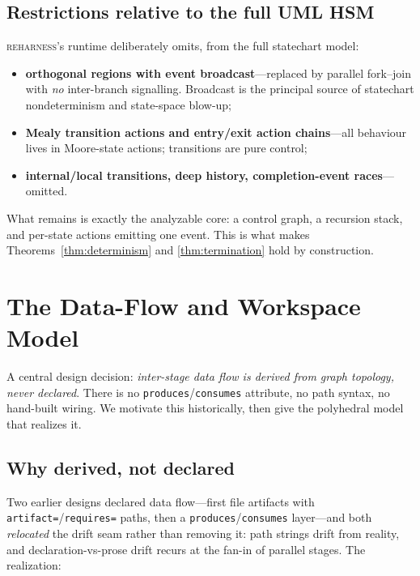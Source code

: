\documentclass[11pt]{article}
\theoremstyle{plain}
\theoremstyle{definition}
\theoremstyle{remark}
\newcommand{\reharness}{\textsc{reharness}}
\newcommand{\code}[1]{\texttt{#1}}
\newcommand{\state}[1]{\textsf{#1}}
\begin{document}
\subsection{Restrictions relative to the full UML HSM}\label{sec:restrictions}

\reharness{}'s runtime deliberately omits, from the full statechart model:
\begin{itemize}[nosep]
  \item \textbf{orthogonal regions with event broadcast}---replaced by
        \state{parallel} fork--join with \emph{no} inter-branch signalling.
        Broadcast is the principal source of statechart nondeterminism and
        state-space blow-up;
  \item \textbf{Mealy transition actions and entry/exit action chains}---all
        behaviour lives in Moore-state actions; transitions are pure control;
  \item \textbf{internal/local transitions, deep history, completion-event
        races}---omitted.
\end{itemize}
What remains is exactly the analyzable core: a control graph, a recursion stack,
and per-state actions emitting one event. This is what makes
Theorems~\ref{thm:determinism} and \ref{thm:termination} hold by construction.

\section{The Data-Flow and Workspace Model}\label{sec:dataflow}

A central design decision: \emph{inter-stage data flow is derived from graph
topology, never declared}. There is no \code{produces}/\code{consumes} attribute,
no path syntax, no hand-built wiring. We motivate this historically, then give the
polyhedral model that realizes it.

\subsection{Why derived, not declared}

Two earlier designs declared data flow---first file artifacts with
\code{artifact=}/\code{requires=} paths, then a \code{produces}/\code{consumes}
layer---and both \emph{relocated} the drift seam rather than removing it: path
strings drift from reality, and declaration-vs-prose drift recurs at the
fan-in of parallel stages. The realization:
\end{document}
